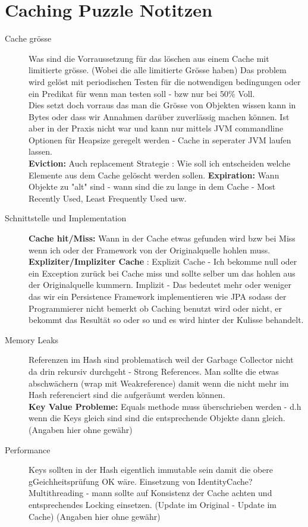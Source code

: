\documentclass[a4paper,10pt]{scrreprt}
\begin{document}
\section{Caching Puzzle Notitzen} %
\label{sec:caching_puzzle_notitzen}
\begin{description}
	\item[Cache grösse] Was sind die Vorraussetzung für das löschen aus einem Cache mit limitierte grösse. (Wobei die alle limitierte Grösse haben)
	Das problem wird gelöst mit periodischen Testen für die notwendigen bedingungen oder ein Predikat für wenn man testen soll - bzw nur bei 50\% Voll.\\
	Dies setzt doch vorraus das man die Grösse von Objekten wissen kann in Bytes oder dass wir Annahmen darüber zuverlässig machen können. Ist aber in der Praxis nicht war und kann nur mittels JVM commandline Optionen für Heapsize geregelt werden - Cache in seperater JVM laufen lassen.\\
	\textbf{Eviction:} Auch replacement Strategie : Wie soll ich entscheiden welche  Elemente aus dem Cache gelöscht werden sollen.
	\textbf{Expiration:} Wann Objekte zu "alt" sind - wann sind die zu lange in dem Cache - Most Recently Used, Least Frequently Used usw.
	\item [Schnittstelle und Implementation] \textbf{Cache hit/Miss:} Wann in der Cache etwas gefunden wird bzw bei Miss wenn ich oder der Framework von der Originalquelle hohlen muss. \\
	\textbf{Expliziter/Impliziter Cache} : Explizit Cache - Ich bekomme null oder ein Exception zurück bei Cache miss und sollte selber um das hohlen aus der Originalquelle kummern. Implizit - Das bedeutet mehr oder weniger das wir ein Persistence Framework implementieren wie JPA sodass der Programmierer nicht bemerkt ob Caching benutzt wird oder nicht, er  bekommt das Resultät so oder so und es wird hinter der Kulisse behandelt.
	\item[Memory Leaks] Referenzen im Hash sind problematisch weil der Garbage Collector nicht da drin rekursiv durchgeht - Strong References. Man sollte die etwas abschwächern (wrap mit Weakreference) damit wenn die nicht mehr im Hash referenciert sind die aufgeräumt werden können. \\
	\textbf{Key Value Probleme:} Equals methode muss überschrieben werden - d.h wenn die Keys gleich sind sind die entsprechende Objekte dann gleich.\\
	(Angaben hier ohne gewähr)
	\item[Performance] Keys sollten in der Hash eigentlich immutable sein damit die obere gGeichheitsprüfung OK wäre. Einsetzung  von IdentityCache? Multithreading - mann sollte auf Konsistenz der Cache achten und entsprechendes Locking einsetzen. (Update im Original - Update im Cache)
	(Angaben hier ohne gewähr)\\
\end{description}
\end{document}
